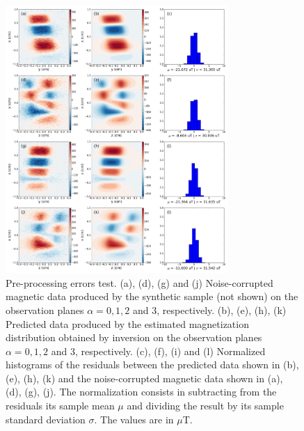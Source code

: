 \documentclass[draft,gc]{agutex}
\begin{document}
 \begin{figure}
 \noindent \includegraphics[width=20pc]{Figs/Fig7_LQ.png}
 \caption{Pre-processing errors test. (a), (d), (g) and (j) Noise-corrupted
 magnetic data produced by the synthetic sample (not shown) on the
 observation planes $\alpha = 0, 1, 2$ and $3$, respectively.
 (b), (e), (h), (k) Predicted data produced by the estimated
 magnetization distribution obtained by inversion on the
 observation planes $\alpha = 0, 1, 2$ and $3$, respectively.
 (c), (f), (i) and (l) Normalized histograms of the residuals between the
 predicted data shown in (b), (e), (h), (k) and the 
 noise-corrupted magnetic data shown in (a), (d), (g), (j). 
 The normalization
 consists in subtracting from the residuals its sample mean $\mu$ 
 and dividing the result by its sample standard deviation $\sigma$.
 The values are in $\mu$T.}
 \label{fig:datafit-pre-processing}
 \end{figure}
 
\end{document}
